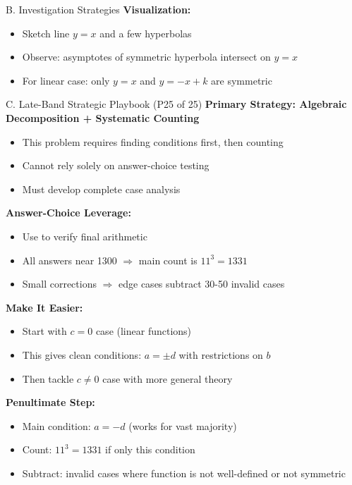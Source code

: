 \documentclass[12pt]{article}
\begin{document}
\begin{strategybox}{B. Investigation Strategies}
\textbf{Visualization:}
\begin{itemize}
    \item Sketch line $y=x$ and a few hyperbolas
    \item Observe: asymptotes of symmetric hyperbola intersect on $y=x$
    \item For linear case: only $y=x$ and $y=-x+k$ are symmetric
\end{itemize}
\end{strategybox}

\begin{strategybox}{C. Late-Band Strategic Playbook (P25 of 25)}
\textbf{Primary Strategy: Algebraic Decomposition + Systematic Counting}
\begin{itemize}
    \item This problem requires finding conditions first, then counting
    \item Cannot rely solely on answer-choice testing
    \item Must develop complete case analysis
\end{itemize}

\textbf{Answer-Choice Leverage:}
\begin{itemize}
    \item Use to verify final arithmetic
    \item All answers near 1300 $\Rightarrow$ main count is $11^3 = 1331$
    \item Small corrections $\Rightarrow$ edge cases subtract 30-50 invalid cases
\end{itemize}

\textbf{Make It Easier:}
\begin{itemize}
    \item Start with $c=0$ case (linear functions)
    \item This gives clean conditions: $a=\pm d$ with restrictions on $b$
    \item Then tackle $c \neq 0$ case with more general theory
\end{itemize}

\textbf{Penultimate Step:}
\begin{itemize}
    \item Main condition: $a=-d$ (works for vast majority)
    \item Count: $11^3 = 1331$ if only this condition
    \item Subtract: invalid cases where function is not well-defined or not symmetric
\end{itemize}
\end{strategybox}
\end{document}
